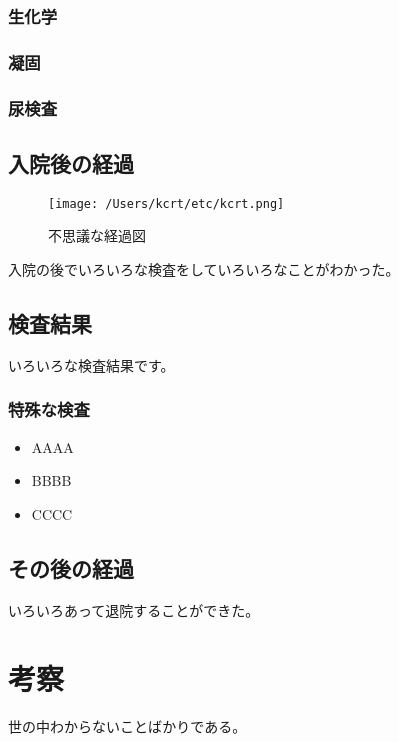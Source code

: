\documentclass[a4j, twocolumn, 10pt]{jsarticle}
\begin{document}
\subsubsection*{生化学}
\subsubsection*{凝固}
\subsubsection*{尿検査}

\subsection*{入院後の経過}
\begin{figure*}[!htb]
	\centering
	\texttt{[image: /Users/kcrt/etc/kcrt.png]}
	\caption{不思議な経過図}
\end{figure*}
入院の後でいろいろな検査をしていろいろなことがわかった。
\subsection*{検査結果}
いろいろな検査結果です。

\subsubsection*{特殊な検査}
\begin{itemize}
\item AAAA
\item BBBB
\item CCCC
\end{itemize}
\setlength\intextsep{0pt}

\subsection*{その後の経過}
いろいろあって退院することができた。

\section{考察}
世の中わからないことばかりである。
\end{document}
